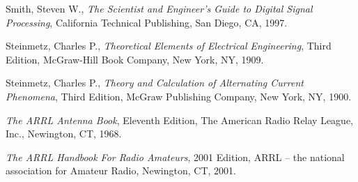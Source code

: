 \noindent
Smith, Steven W., \textit{The Scientist and Engineer's Guide to Digital Signal Processing}, California Technical Publishing, San Diego, CA, 1997.

\vskip 10pt

\noindent
Steinmetz, Charles P., \textit{Theoretical Elements of Electrical Engineering}, Third Edition, McGraw-Hill Book Company, New York, NY, 1909.

\vskip 10pt

\noindent
Steinmetz, Charles P., \textit{Theory and Calculation of Alternating Current Phenomena}, Third Edition, McGraw Publishing Company, New York, NY, 1900.

\vskip 10pt

\noindent
\textit{The ARRL Antenna Book}, Eleventh Edition, The American Radio Relay League, Inc., Newington, CT, 1968.

\vskip 10pt

\noindent
\textit{The ARRL Handbook For Radio Amateurs}, 2001 Edition, ARRL -- the national association for Amateur Radio, Newington, CT, 2001.















% 
